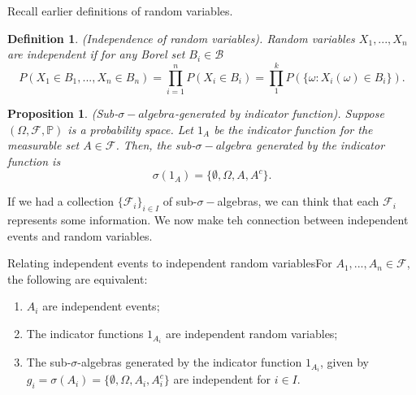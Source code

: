 \documentclass[twoside]{article}
\newtheorem{proposition}[theorem]{Proposition}
\newtheorem{definition}[theorem]{Definition}
\newcommand{\sigmalgebra}{\mathcal{F}}
\newcommand{\sa}{\sigma-algebra}
\newcommand{\prob}{\mathbb{P}}
\begin{document}
Recall earlier definitions of random variables.


\begin{definition}(Independence of random variables). Random variables $X_1,...,X_n$ are independent if for any Borel set $B_i \in \mathcal{B}$
$$
P(X_1 \in B_1, ..., X_n \in B_n) = \prod_{i=1}^{n}P(X_i \in B_i)  = \prod_{1}^kP(\{\omega: X_i(\omega) \in B_i\}).
$$
\end{definition}



\begin{proposition}(Sub-$\sa$-generated by indicator function). Suppose $(\Omega, \sigmalgebra, \prob)$ is a probability space. Let $1_{A}$ be the indicator function for the measurable set $A \in \sigmalgebra$. Then, the sub-$\sa$ generated by the indicator function is
$$
\sigma(1_{A}) = \{\emptyset, \Omega, A, A^c\}.
$$
\end{proposition}


If we had a collection $\{\mathcal{F}_i\}_{i \in I}$ of sub-$\sigma-$algebras, we can think that each $\mathcal{F}_i$ represents some information. We now make teh connection between independent events and random variables.

\begin{proposition_exam}{Relating independent events to independent random variables}{}For $A_1,...,A_n \in \mathcal{F}$, the following are equivalent:
\begin{enumerate}
\item $A_i$ are independent events;
\item The indicator functions $1_{A_{i}}$ are independent random variables;
\item The sub-$\sigma$-algebras generated by the indicator function $1_{A_{i}}$, given by $g_i = \sigma(A_{i}) = \{\emptyset, \Omega, A_i, A_i^c\}$ are independent for $i \in I$.
\end{enumerate}
\end{proposition_exam}
\end{document}
